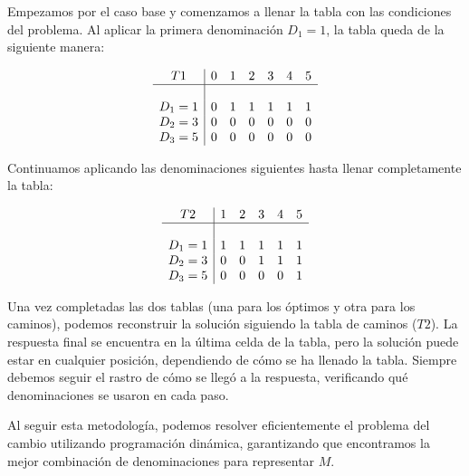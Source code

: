 Empezamos por el caso base y comenzamos a llenar la tabla con las condiciones del problema. Al aplicar la primera denominación $D_1=1$, la tabla queda de la siguiente manera:

\[
	\begin{array}{c|cccccc}
		T1    & 0 & 1 & 2 & 3 & 4 & 5 \\
		\hline                        \\
		D_1=1 & 0 & 1 & 1 & 1 & 1 & 1 \\
		D_2=3 & 0 & 0 & 0 & 0 & 0 & 0 \\
		D_3=5 & 0 & 0 & 0 & 0 & 0 & 0 \\
	\end{array}
\]

Continuamos aplicando las denominaciones siguientes hasta llenar completamente la tabla:

\[
	\begin{array}{c|cccccc}
		T2    & 1 & 2 & 3 & 4 & 5 \\
		\hline                    \\
		D_1=1 & 1 & 1 & 1 & 1 & 1 \\
		D_2=3 & 0 & 0 & 1 & 1 & 1 \\
		D_3=5 & 0 & 0 & 0 & 0 & 1 \\
	\end{array}
\]

Una vez completadas las dos tablas (una para los óptimos y otra para los caminos), podemos reconstruir la solución siguiendo la tabla de caminos ($T2$). La respuesta final se encuentra en la última celda de la tabla, pero la solución puede estar en cualquier posición, dependiendo de cómo se ha llenado la tabla. Siempre debemos seguir el rastro de cómo se llegó a la respuesta, verificando qué denominaciones se usaron en cada paso.

Al seguir esta metodología, podemos resolver eficientemente el problema del cambio utilizando programación dinámica, garantizando que encontramos la mejor combinación de denominaciones para representar $M$.







